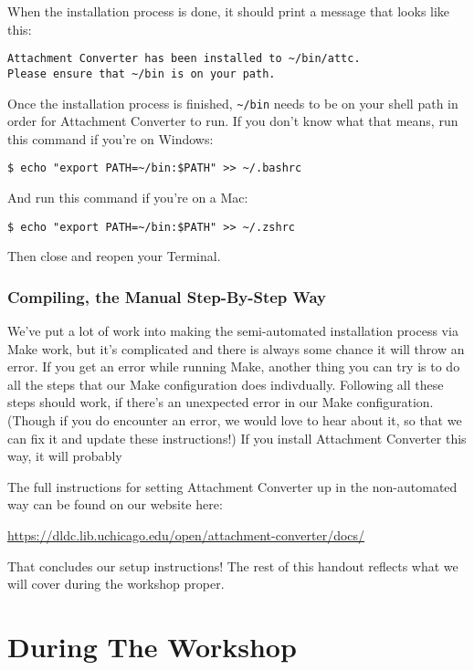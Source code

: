\documentclass[11pt]{article}
\begin{document}
\begin{enumerate}
When the installation process is done, it should print a message that
looks like this:

\begin{verbatim}
Attachment Converter has been installed to ~/bin/attc.
Please ensure that ~/bin is on your path.
\end{verbatim}

Once the installation process is finished, \texttt{\textasciitilde{}/bin} needs to be on your
shell path in order for Attachment Converter to run.  If you don't
know what that means, run this command if you're on Windows:

\begin{verbatim}
$ echo "export PATH=~/bin:$PATH" >> ~/.bashrc
\end{verbatim}

And run this command if you're on a Mac:

\begin{verbatim}
$ echo "export PATH=~/bin:$PATH" >> ~/.zshrc
\end{verbatim}

Then close and reopen your Terminal.
\end{enumerate}

\subsubsection{Compiling, the Manual Step-By-Step Way}
\label{sec:orgeffd146}

We've put a lot of work into making the semi-automated installation
process via Make work, but it's complicated and there is always some
chance it will throw an error. If you get an error while running Make,
another thing you can try is to do all the steps that our Make
configuration does indivdually.  Following all these steps should
work, if there's an unexpected error in our Make configuration.
(Though if you do encounter an error, we would love to hear about it,
so that we can fix it and update these instructions!)  If you install Attachment Converter this way, it will probably 

The full instructions for setting Attachment Converter up in the
non-automated way can be found on our website here:

\url{https://dldc.lib.uchicago.edu/open/attachment-converter/docs/}

That concludes our setup instructions!  The rest of this handout
reflects what we will cover during the workshop proper.

\section{During The Workshop \label{org753a434}}
\label{sec:org14190c6}
\end{document}
